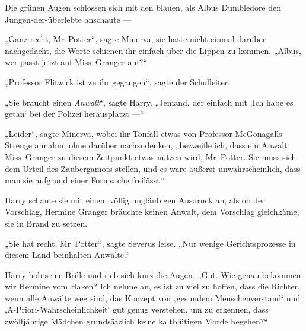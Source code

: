 Die grünen Augen schlossen sich mit den blauen, als Albus Dumbledore den Jungen-der-überlebte anschaute —

„Ganz recht, Mr~Potter“, sagte Minerva, sie hatte nicht einmal darüber nachgedacht, die Worte schienen ihr einfach über die Lippen zu kommen.
„Albus, wer passt jetzt auf Miss~Granger auf?“

„Professor Flitwick ist zu ihr gegangen“, sagte der Schulleiter.

„Sie braucht einen \emph{Anwalt}“, sagte Harry.
„Jemand, der einfach mit ‚Ich habe es getan‘ bei der Polizei herausplatzt —“

„Leider“, sagte Minerva, wobei ihr Tonfall etwas von Professor McGonagalls Strenge annahm, ohne darüber nachzudenken, „bezweifle ich, dass ein Anwalt Miss~Granger zu diesem Zeitpunkt etwas nützen wird, Mr~Potter. Sie muss sich dem Urteil des Zaubergamots stellen, und es wäre äußerst unwahrscheinlich, dass man sie aufgrund einer Formsache freilässt.“

Harry schaute sie mit einem völlig ungläubigen Ausdruck an, als ob der Vorschlag, Hermine Granger bräuchte keinen Anwalt, dem Vorschlag gleichkäme, sie in Brand zu setzen.

„Sie hat recht, Mr~Potter“, sagte Severus leise.
„Nur wenige Gerichtsprozesse in diesem Land beinhalten Anwälte.“

Harry hob seine Brille und rieb sich kurz die Augen.
„Gut. Wie genau bekommen wir Hermine vom Haken? Ich nehme an, es ist zu viel zu hoffen, dass die Richter, wenn alle Anwälte weg sind, das Konzept von ‚gesundem Menschenverstand‘ und ‚A-Priori-Wahrscheinlichkeit‘ gut genug verstehen, um zu erkennen, dass zwölfjährige Mädchen grundsätzlich keine kaltblütigen Morde begehen?“

